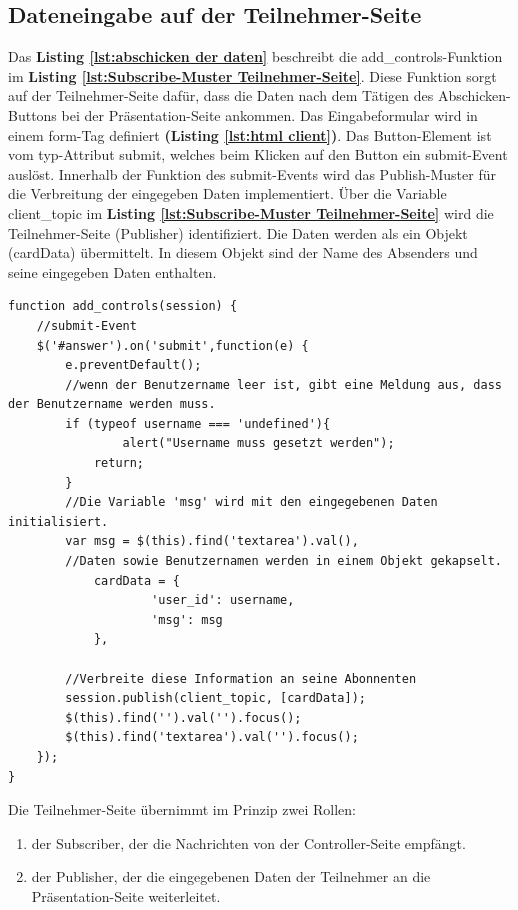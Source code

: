 \subsection{Dateneingabe auf der Teilnehmer-Seite}
\label{subsec:Dateneingabe auf der Teilnehmer-Seite}
Das \textbf{Listing \ref{lst:abschicken der daten}} beschreibt die \glqq add\_controls\grqq{}-Funktion im \textbf{Listing \ref{lst:Subscribe-Muster Teilnehmer-Seite}}. Diese Funktion sorgt auf der Teilnehmer-Seite dafür, dass die Daten nach dem Tätigen des Abschicken-Buttons bei der Präsentation-Seite ankommen. Das Eingabeformular wird in einem form-Tag definiert \textbf{(Listing \ref{lst:html client})}. Das Button-Element ist vom typ-Attribut \glqq submit\grqq{}, welches beim Klicken auf den Button ein submit-Event auslöst. Innerhalb der Funktion des submit-Events wird das Publish-Muster für die Verbreitung der eingegeben Daten implementiert. Über die Variable \glqq client\_topic\grqq{} im \textbf{Listing \ref{lst:Subscribe-Muster Teilnehmer-Seite}} wird die Teilnehmer-Seite (Publisher) identifiziert. Die Daten werden als ein Objekt (cardData) übermittelt. In diesem Objekt sind der Name des Absenders und seine eingegeben Daten enthalten. \bigskip

\begin{lstlisting}[caption={Funktion für das Abschicken von Daten auf der Teilnehmer-Seite - JavaScript}, label=lst:abschicken der daten, captionpos=b]
function add_controls(session) {
	//submit-Event
	$('#answer').on('submit',function(e) {
		e.preventDefault();
		//wenn der Benutzername leer ist, gibt eine Meldung aus, dass der Benutzername werden muss.
		if (typeof username === 'undefined'){
        		alert("Username muss gesetzt werden");
            return;
   		}
		//Die Variable 'msg' wird mit den eingegebenen Daten initialisiert.
		var msg = $(this).find('textarea').val(),
		//Daten sowie Benutzernamen werden in einem Objekt gekapselt.
			cardData = {
            		'user_id': username,
            		'msg': msg
            },
            
		//Verbreite diese Information an seine Abonnenten
		session.publish(client_topic, [cardData]);
		$(this).find('').val('').focus();
		$(this).find('textarea').val('').focus();
	});
}
\end{lstlisting}

Die Teilnehmer-Seite übernimmt im Prinzip zwei Rollen:
\begin{enumerate}
\item der Subscriber, der die Nachrichten von der Controller-Seite empfängt.
\item der Publisher, der die eingegebenen Daten der Teilnehmer an die Präsentation-Seite weiterleitet.
\end{enumerate}

